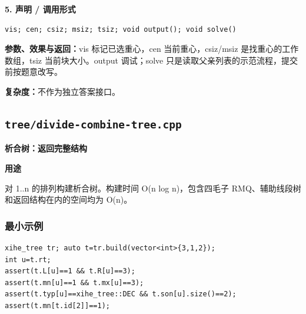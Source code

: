 \documentclass[UTF8,a4paper,10pt]{ctexart}
\newcommand{\TemplUsage}[1]{\textbf{用途}\par #1\par}
\begin{document}
\noindent\begin{minipage}{\textwidth}
\textbf{5. 声明 / 调用形式}
\begin{lstlisting}
vis; cen; csiz; msiz; tsiz; void output(); void solve()
\end{lstlisting}
\textbf{参数、效果与返回：}vis 标记已选重心，cen 当前重心，csiz/msiz 是找重心的工作数组，tsiz 当前块大小。output 调试；solve 只是读取父亲列表的示范流程，提交前按题意改写。

\textbf{复杂度：}不作为独立答案接口。

\end{minipage}\par\vspace{0.4em}
\clearpage
\subsection{\texttt{tree/divide-combine-tree.cpp}}
\textbf{析合树：返回完整结构}\par
\TemplUsage{对 1..n 的排列构建析合树。构建时间 O(n log n)，包含四毛子 RMQ、辅助线段树和返回结构在内的空间均为 O(n)。}
\subsubsection*{最小示例}
\begin{lstlisting}
xihe_tree tr; auto t=tr.build(vector<int>{3,1,2});
int u=t.rt;
assert(t.L[u]==1 && t.R[u]==3);
assert(t.mn[u]==1 && t.mx[u]==3);
assert(t.typ[u]==xihe_tree::DEC && t.son[u].size()==2);
assert(t.mn[t.id[2]]==1);
\end{lstlisting}
\end{document}
